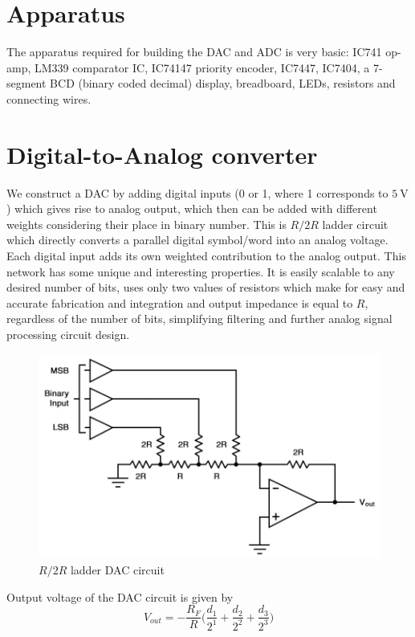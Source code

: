 \documentclass[%
 reprint,
nofootinbib,
 amsmath,amssymb,
 aps,
floatfix,
]{revtex4-2}
\begin{document}
    
\section{Apparatus}
    The apparatus required for building the DAC and ADC is very basic: IC741 op-amp, LM339 comparator IC, IC74147 priority encoder, IC7447, IC7404, a 7-segment BCD (binary coded decimal) display, breadboard, LEDs, resistors and connecting wires.

\section{Digital-to-Analog converter}
    We construct a DAC by adding digital inputs (0 or 1, where 1 corresponds to $\SI{5}{\volt}$) which gives rise to analog output, which then can be added with different weights considering their place in binary number. This is $R/2R$ ladder circuit which directly converts a parallel digital symbol/word into an analog voltage. Each digital input adds its own weighted contribution to the analog output. This network has some unique and interesting properties. It is easily scalable to any desired number of bits, uses only two values of resistors which make for easy and accurate fabrication and integration and output impedance is equal to $R$, regardless of the number of bits, simplifying filtering and further analog signal processing circuit design.
    \begin{figure}
        \centering
        \includegraphics[scale = 0.4]{Figures/dac.png}
        \caption{$R/2R$ ladder DAC circuit}
        \label{fig:DAC}
    \end{figure}
    Output voltage of the DAC circuit is given by
    \begin{equation}
        V_{out} = -\dfrac{R_F}{R}\Bigg( \dfrac{d_1}{2^1} +\dfrac{d_2}{2^2}+\dfrac{d_3}{2^3} \Bigg)
    \end{equation}
\end{document}
